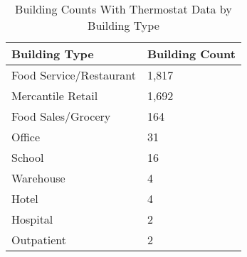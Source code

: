 \begin{table}[h!]
\small
\caption[Building Counts with Thermostat Data]{Building Counts With Thermostat Data by Building Type}
\label{tab:bas_thermostat_count_by_btype}
    \centering
    \begin{tabular}{|l|l|}
    \hline
        \textbf{Building Type} &
        \textbf{Building Count} \\ \hline
        Food Service/Restaurant & 1,817 \\ \hline
        Mercantile Retail & 1,692 \\ \hline
        Food Sales/Grocery & 164 \\ \hline
        Office & 31 \\ \hline
        School & 16 \\ \hline
        Warehouse & 4 \\ \hline
        Hotel & 4 \\ \hline
        Hospital & 2 \\ \hline
        Outpatient & 2 \\ \hline
    \end{tabular}
\end{table}